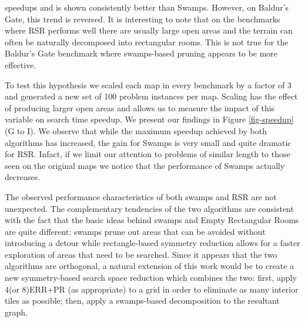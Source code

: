 speedups and is shown consistently better than Swamps. However, on Baldur's
Gate, this trend is reversed.  
It is interesting to note that on the
benchmarks where RSR performs well there are usually large open areas and the
terrain can often be naturally decomposed into rectangular rooms.  This is not
true for the Baldur's Gate benchmark where swamps-based pruning appears to be
more effective.
\par
To test this hypothesis we scaled each map in every benchmark by a factor of 3
and generated a new set of 100 problem instances per map. 
Scaling has the effect of producing larger open areas and allows 
us to measure the impact of this variable on search time speedup.
We present our findings in  Figure \ref{fig-speedup} (G to I).
We observe that while the maximum speedup achieved by both algorithms has
increased, the gain for Swamps is very small and quite dramatic for RSR.
Infact, if we limit our attention to problems of similar length to those seen 
on the original maps we notice that the performance of Swamps actually
decreases.
\par
The observed performance characteristics of both swamps and RSR
are not unexpected.
The complementary tendencies of the two algorithms
are consistent with the fact that 
the basic ideas behind swamps and Empty Rectangular Rooms are quite different:
swamps prune out areas that can be avoided without introducing a detour while 
rectangle-based symmetry reduction allows for a faster exploration of areas that need to be searched.
Since it appears that the two algorithms are orthogonal, a natural extension of this work would 
be to create a new symmetry-based search space reduction which combines the two: 
first, apply 4(or 8)ERR+PR (as appropriate) to a grid in order to eliminate as many interior tiles 
as possible; then, apply a swamps-based decomposition to the resultant graph.

